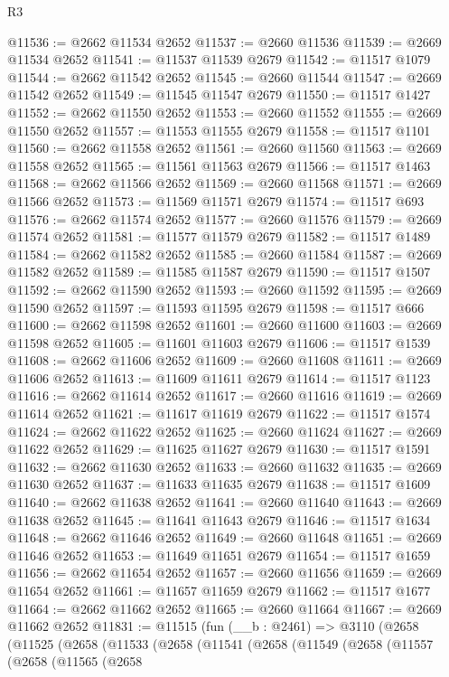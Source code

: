 \begin{lexlean}{R3}
\begin{coremodule}
@11536 := @2662 @11534 @2652
@11537 := @2660 @11536
@11539 := @2669 @11534 @2652
@11541 := @11537 @11539 @2679
@11542 := @11517 @1079
@11544 := @2662 @11542 @2652
@11545 := @2660 @11544
@11547 := @2669 @11542 @2652
@11549 := @11545 @11547 @2679
@11550 := @11517 @1427
@11552 := @2662 @11550 @2652
@11553 := @2660 @11552
@11555 := @2669 @11550 @2652
@11557 := @11553 @11555 @2679
@11558 := @11517 @1101
@11560 := @2662 @11558 @2652
@11561 := @2660 @11560
@11563 := @2669 @11558 @2652
@11565 := @11561 @11563 @2679
@11566 := @11517 @1463
@11568 := @2662 @11566 @2652
@11569 := @2660 @11568
@11571 := @2669 @11566 @2652
@11573 := @11569 @11571 @2679
@11574 := @11517 @693
@11576 := @2662 @11574 @2652
@11577 := @2660 @11576
@11579 := @2669 @11574 @2652
@11581 := @11577 @11579 @2679
@11582 := @11517 @1489
@11584 := @2662 @11582 @2652
@11585 := @2660 @11584
@11587 := @2669 @11582 @2652
@11589 := @11585 @11587 @2679
@11590 := @11517 @1507
@11592 := @2662 @11590 @2652
@11593 := @2660 @11592
@11595 := @2669 @11590 @2652
@11597 := @11593 @11595 @2679
@11598 := @11517 @666
@11600 := @2662 @11598 @2652
@11601 := @2660 @11600
@11603 := @2669 @11598 @2652
@11605 := @11601 @11603 @2679
@11606 := @11517 @1539
@11608 := @2662 @11606 @2652
@11609 := @2660 @11608
@11611 := @2669 @11606 @2652
@11613 := @11609 @11611 @2679
@11614 := @11517 @1123
@11616 := @2662 @11614 @2652
@11617 := @2660 @11616
@11619 := @2669 @11614 @2652
@11621 := @11617 @11619 @2679
@11622 := @11517 @1574
@11624 := @2662 @11622 @2652
@11625 := @2660 @11624
@11627 := @2669 @11622 @2652
@11629 := @11625 @11627 @2679
@11630 := @11517 @1591
@11632 := @2662 @11630 @2652
@11633 := @2660 @11632
@11635 := @2669 @11630 @2652
@11637 := @11633 @11635 @2679
@11638 := @11517 @1609
@11640 := @2662 @11638 @2652
@11641 := @2660 @11640
@11643 := @2669 @11638 @2652
@11645 := @11641 @11643 @2679
@11646 := @11517 @1634
@11648 := @2662 @11646 @2652
@11649 := @2660 @11648
@11651 := @2669 @11646 @2652
@11653 := @11649 @11651 @2679
@11654 := @11517 @1659
@11656 := @2662 @11654 @2652
@11657 := @2660 @11656
@11659 := @2669 @11654 @2652
@11661 := @11657 @11659 @2679
@11662 := @11517 @1677
@11664 := @2662 @11662 @2652
@11665 := @2660 @11664
@11667 := @2669 @11662 @2652
@11831 := @11515
    (fun (__b : @2461) =>
    @3110
      (@2658
        (@11525
          (@2658
            (@11533
              (@2658
                (@11541
                  (@2658
                    (@11549
                      (@2658
                        (@11557
                          (@2658
                            (@11565
                              (@2658

\end{coremodule}
\end{lexlean}
